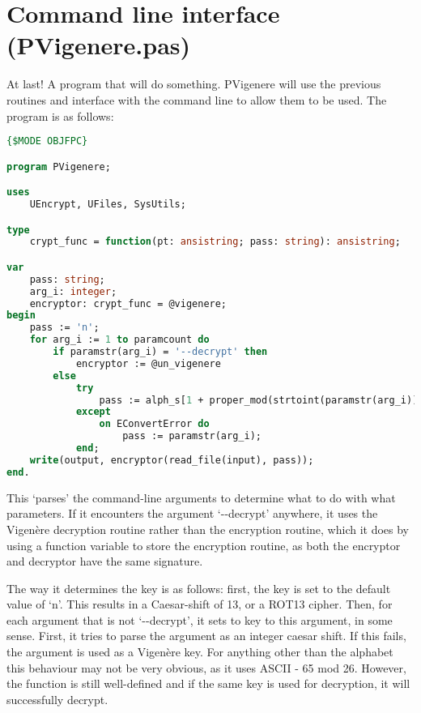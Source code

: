 \documentclass{article}
\begin{document}
    \section{Command line interface (PVigenere.pas)}
    At last! A program that will do something. PVigenere will use the previous
    routines and interface with the command line to allow them to be used. The
    program is as follows:

\begin{lstlisting}[language=Pascal, caption=Command-line interface for Vigen\`ere routines (PVigenere.pas)]
{$MODE OBJFPC}

program PVigenere;

uses
    UEncrypt, UFiles, SysUtils;

type
    crypt_func = function(pt: ansistring; pass: string): ansistring;

var
    pass: string;
    arg_i: integer;
    encryptor: crypt_func = @vigenere;
begin
    pass := 'n';
    for arg_i := 1 to paramcount do
        if paramstr(arg_i) = '--decrypt' then
            encryptor := @un_vigenere
        else
            try
                pass := alph_s[1 + proper_mod(strtoint(paramstr(arg_i)), 26)];
            except
                on EConvertError do
                    pass := paramstr(arg_i);
            end;
    write(output, encryptor(read_file(input), pass));
end.
\end{lstlisting}
\iffalse $ \fi %

    This `parses' the command-line arguments to determine what to do with what
    parameters. If it encounters the argument `-{}-decrypt' anywhere, it uses the
    Vigen\`ere decryption routine rather than the encryption routine, which it
    does by using a function variable to store the encryption routine, as both
    the encryptor and decryptor have the same signature.

    The way it determines the key is as follows: first, the key is set to the
    default value of `n'. This results in a Caesar-shift of 13, or a ROT13
    cipher. Then, for each argument that is not `-{}-decrypt', it sets to key to
    this argument, in some sense. First, it tries to parse the argument as an
    integer caesar shift. If this fails, the argument is used as a Vigen\`ere
    key. For anything other than the alphabet this behaviour may not be very
    obvious, as it uses ASCII - 65 mod 26. However, the function is still
    well-defined and if the same key is used for decryption, it will
    successfully decrypt.
\end{document}
